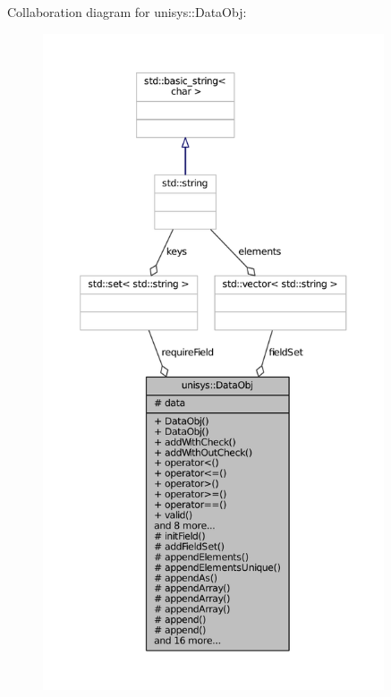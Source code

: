 Collaboration diagram for unisys\-:\-:Data\-Obj\-:
\nopagebreak
\begin{figure}[H]
\begin{center}
\leavevmode
\includegraphics[height=550pt]{classunisys_1_1DataObj__coll__graph}
\end{center}
\end{figure}
